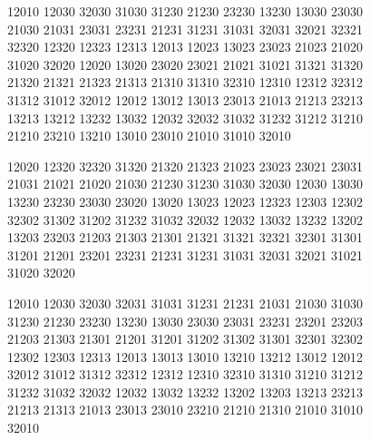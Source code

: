 \begingroup\footnotesize\ttfamily\begin{flushleft}
12010 12030 32030 31030 31230 21230 23230 13230 13030 23030\\
21030 21031 23031 23231 21231 31231 31031 32031 32021 32321\\
32320 12320 12323 12313 12013 12023 13023 23023 21023 21020\\
31020 32020 12020 13020 23020 23021 21021 31021 31321 31320\\
21320 21321 21323 21313 21310 31310 32310 12310 12312 32312\\
31312 31012 32012 12012 13012 13013 23013 21013 21213 23213\\
13213 13212 13232 13032 12032 32032 31032 31232 31212 31210\\
21210 23210 13210 13010 23010 21010 31010 32010\\
\end{flushleft}\endgroup
\begingroup\footnotesize\ttfamily\begin{flushleft}
12020 12320 32320 31320 21320 21323 21023 23023 23021 23031\\
21031 21021 21020 21030 21230 31230 31030 32030 12030 13030\\
13230 23230 23030 23020 13020 13023 12023 12323 12303 12302\\
32302 31302 31202 31232 31032 32032 12032 13032 13232 13202\\
13203 23203 21203 21303 21301 21321 31321 32321 32301 31301\\
31201 21201 23201 23231 21231 31231 31031 32031 32021 31021\\
31020 32020\\
\end{flushleft}\endgroup
\begingroup\footnotesize\ttfamily\begin{flushleft}
12010 12030 32030 32031 31031 31231 21231 21031 21030 31030\\
31230 21230 23230 13230 13030 23030 23031 23231 23201 23203\\
21203 21303 21301 21201 31201 31202 31302 31301 32301 32302\\
12302 12303 12313 12013 13013 13010 13210 13212 13012 12012\\
32012 31012 31312 32312 12312 12310 32310 31310 31210 31212\\
31232 31032 32032 12032 13032 13232 13202 13203 13213 23213\\
21213 21313 21013 23013 23010 23210 21210 21310 21010 31010\\
32010\\
\end{flushleft}\endgroup

